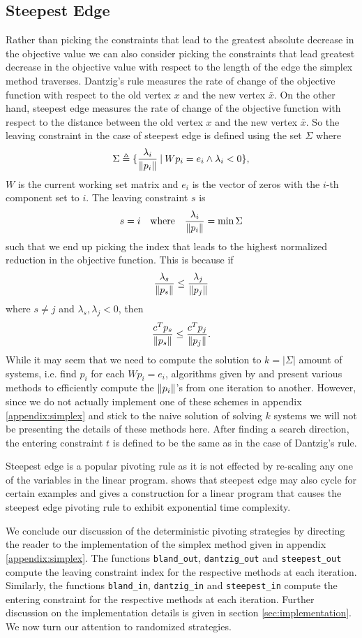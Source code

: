 \documentclass{standalone}
\begin{document}
\subsection{Steepest Edge}
\label{sec:pivot:steepest}
{
  Rather than picking the constraints that lead to the greatest absolute decrease in the objective value we can also consider picking the constraints that lead greatest decrease in the objective value with respect to the length of the edge the simplex method traverses. Dantzig's rule measures the rate of change of the objective function with respect to the old vertex $x$ and the new vertex $\bar{x}$. On the other hand, steepest edge measures the rate of change of the objective function with respect to the distance between the old vertex $x$ and the new vertex $\bar{x}$. So the leaving constraint in the case of steepest edge is defined using the set $\Sigma$ where
  \[
    \Sigma\triangleq\{\frac{\lambda_{i}}{\left\lVert p_{i}\right\rVert}\:|\:Wp_{i}=e_{i}\land\lambda_{i}<0\},
  \]
  $W$ is the current working set matrix and $e_{i}$ is the vector of zeros with the $i$-th component set to $i$. The leaving constraint $s$ is
  \[
    s=i\quad\text{where}\quad \frac{\lambda_{i}}{\left\lVert p_{i}\right\rVert}=\min \Sigma
  \]
  such that we end up picking the index that leads to the highest normalized reduction in the objective function. This is because if
  \[
    \frac{\lambda_{s}}{\left\lVert p_{s}\right\rVert}\le\frac{\lambda_{j}}{\left\lVert p_{j}\right\rVert}
  \]
  where $s\ne j$ and $\lambda_{s},\lambda_{j}<0$, then
  \[
    \frac{c^{T}p_{s}}{\left\lVert p_{s}\right\rVert}\le\frac{c^{T}p_{j}}{\left\lVert p_{j}\right\rVert}.
  \]
  While it may seem that we need to compute the solution to $k=\left|\Sigma\right|$ amount of systems, i.e. find $p_{i}$ for each $Wp_{i}=e_{i}$, algorithms given by \cite{goldfarb1977practicable} and \cite{forrest1992steepest} present various methods to efficiently compute the $\left\lVert p_{i}\right\rVert$'s from one iteration to another. However, since we do not actually implement one of these schemes in appendix \ref{appendix:simplex} and stick to the naive solution of solving $k$ systems we will not be presenting the details of these methods here. After finding a search direction, the entering constraint $t$ is defined to be the same as in the case of Dantzig's rule.\par
  Steepest edge is a popular pivoting rule as it is not effected by re-scaling any one of the variables in the linear program. \cite{hall2004simplest} shows that steepest edge may also cycle for certain examples and \cite{goldfarb1979worst} gives a construction for a linear program that causes the steepest edge pivoting rule to exhibit exponential time complexity.\par
}
We conclude our discussion of the deterministic pivoting strategies by directing the reader to the implementation of the simplex method given in appendix \ref{appendix:simplex}. The functions \verb|bland_out|, \verb|dantzig_out| and \verb|steepest_out| compute the leaving constraint index for the respective methods at each iteration. Similarly, the functions \verb|bland_in|, \verb|dantzig_in| and \verb|steepest_in| compute the entering constraint for the respective methods at each iteration. Further discussion on the implementation details is given in section \ref{sec:implementation}. We now turn our attention to randomized strategies.
\end{document}
